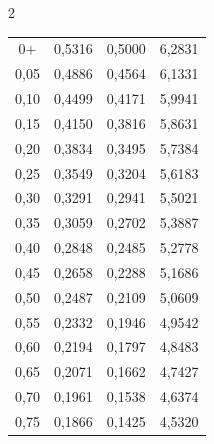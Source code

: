 \begin{multicols}{2}
{\begin{center}
\begin{tabular}{|c|c|c|c|}
\hline


 0+   & 0,5316 & 0,5000 & 6,2831  \\




 0,05 & 0,4886 & 0,4564 & 6,1331  \\




 0,10 & 0,4499 & 0,4171 & 5,9941  \\




 0,15 & 0,4150 & 0,3816 & 5,8631  \\




 0,20 & 0,3834 & 0,3495 & 5,7384  \\




 0,25 & 0,3549 & 0,3204 & 5,6183  \\




 0,30 & 0,3291 & 0,2941 & 5,5021  \\




 0,35 & 0,3059 & 0,2702 & 5,3887 \\




 0,40 & 0,2848 & 0,2485 & 5,2778 \\




 0,45 & 0,2658 & 0,2288 & 5,1686 \\




 0,50 & 0,2487 & 0,2109 & 5,0609 \\




 0,55 & 0,2332 & 0,1946 & 4,9542 \\




 0,60 & 0,2194 & 0,1797 & 4,8483 \\




 0,65 & 0,2071 & 0,1662 & 4,7427 \\




 0,70 & 0,1961 & 0,1538 & 4,6374 \\




 0,75 & 0,1866 & 0,1425 & 4,5320 \\



\end{tabular}
\end{center}}
\end{multicols}
